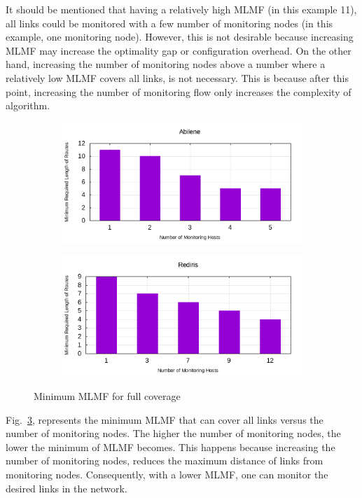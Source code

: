 \documentclass[10pt, journal, letterpaper]{IEEEtran}
\begin{document}
It should be mentioned that having a relatively high MLMF (in this example 11), all links could be monitored with a few number of monitoring nodes (in this example, one monitoring node). However, this is not desirable because increasing MLMF may increase the optimality gap or configuration overhead. On the other hand, increasing the number of monitoring nodes above a number where a relatively low MLMF covers all links, is not necessary. This is because after this point, increasing the number of monitoring flow only increases the complexity of algorithm. 
\begin{figure}
    \begin{subfigure}{\columnwidth}
       \centering
        \includegraphics[width=0.8\columnwidth]{img/eval_Abilene_bar_min_length_of_routes_with_different_monitoring_nodes.png}
        \label{fig:ABI_bar_min_MLMF_full_cover}
    \end{subfigure}
    \begin{subfigure}{\columnwidth}
      \centering
      \includegraphics[width=0.8\columnwidth]{img/eval_Rediris_bar_min_length_of_routes_with_different_monitoring_nodes.png}
     \label{fig:RED_bar_min_MLMF_full_cover}
    \end{subfigure}
    \caption{Minimum MLMF for full coverage}
    \label{fig:bar_min_MLMF_full_cover}
\end{figure}
Fig.~\ref{fig:bar_min_MLMF_full_cover}, represents the minimum MLMF that can cover all links versus the number of monitoring nodes. The higher the number of monitoring nodes, the lower the minimum of MLMF becomes. This happens because increasing the number of monitoring nodes, reduces the maximum distance of links from monitoring nodes. Consequently, with a lower MLMF, one can monitor the desired links in the network. %
\end{document}
